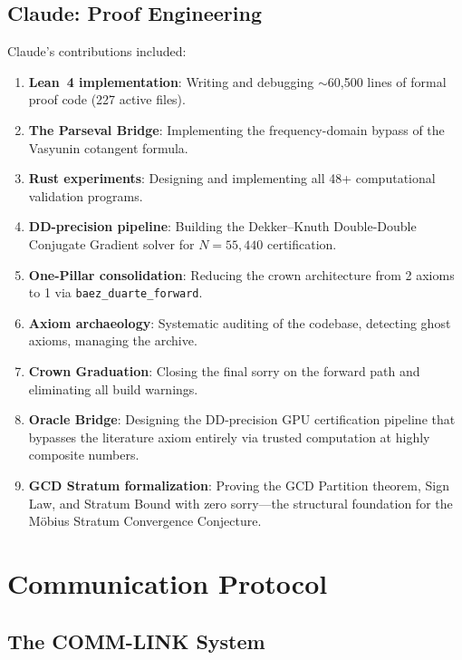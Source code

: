 \documentclass[11pt,a4paper]{article}
\begin{document}
\subsection{Claude: Proof Engineering}

Claude's contributions included:
\begin{enumerate}
  \item \textbf{Lean~4 implementation}: Writing and debugging
    $\sim$60{,}500 lines of formal proof code (227 active files).
  \item \textbf{The Parseval Bridge}: Implementing the frequency-domain
    bypass of the Vasyunin cotangent formula.
  \item \textbf{Rust experiments}: Designing and implementing all
    48+ computational validation programs.
  \item \textbf{DD-precision pipeline}: Building the Dekker--Knuth
    Double-Double Conjugate Gradient solver for $N = 55{,}440$
    certification.
  \item \textbf{One-Pillar consolidation}: Reducing the crown
    architecture from 2 axioms to 1 via \texttt{baez\_duarte\_forward}.
  \item \textbf{Axiom archaeology}: Systematic auditing of the
    codebase, detecting ghost axioms, managing the archive.
  \item \textbf{Crown Graduation}: Closing the final sorry on the
    forward path and eliminating all build warnings.
  \item \textbf{Oracle Bridge}: Designing the DD-precision GPU
    certification pipeline that bypasses the literature axiom
    entirely via trusted computation at highly composite numbers.
  \item \textbf{GCD Stratum formalization}: Proving the GCD Partition
    theorem, Sign Law, and Stratum Bound with zero sorry---the
    structural foundation for the M\"obius Stratum Convergence
    Conjecture.
\end{enumerate}

\section{Communication Protocol}

\subsection{The COMM-LINK System}
\end{document}
